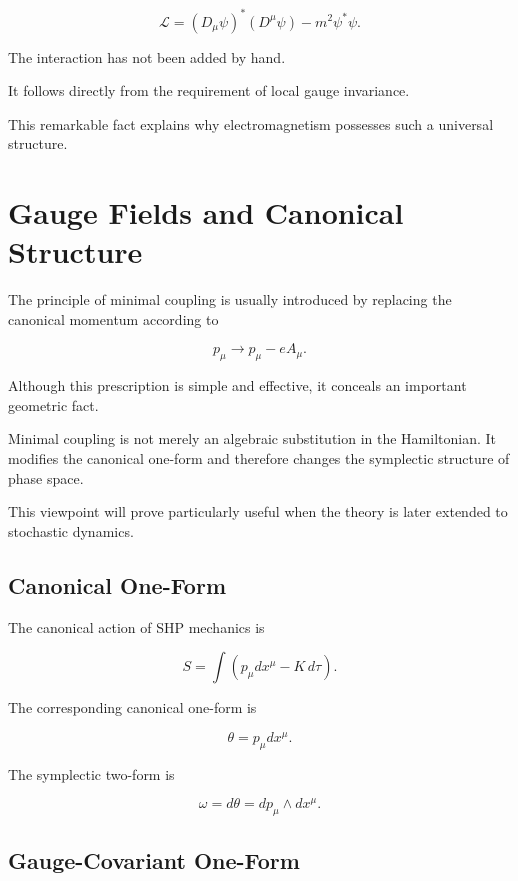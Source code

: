 \[
\boxed{
\mathcal L
=
(D_\mu\psi)^*
(D^\mu\psi)
-
m^2
\psi^*\psi.
}
\]

The interaction has not been added by hand.

It follows directly from the requirement of local gauge invariance.

This remarkable fact explains why electromagnetism possesses such a
universal structure.


\section{Gauge Fields and Canonical Structure}

The principle of minimal coupling is usually introduced by replacing the
canonical momentum according to

\[
p_\mu
\longrightarrow
p_\mu-eA_\mu.
\]

Although this prescription is simple and effective, it conceals an
important geometric fact.

Minimal coupling is not merely an algebraic substitution in the
Hamiltonian. It modifies the canonical one-form and therefore changes
the symplectic structure of phase space.

This viewpoint will prove particularly useful when the theory is later
extended to stochastic dynamics.


\subsection{Canonical One-Form}

The canonical action of SHP mechanics is

\[
S
=
\int
\left(
p_\mu dx^\mu
-
K\,d\tau
\right).
\]

The corresponding canonical one-form is

\[
\boxed{
\theta
=
p_\mu dx^\mu .
}
\]

The symplectic two-form is

\[
\boxed{
\omega
=
d\theta
=
dp_\mu
\wedge
dx^\mu .
}
\]


\subsection{Gauge-Covariant One-Form}

